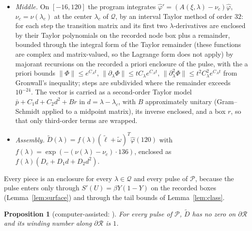 \documentclass[11pt]{article}
\newtheorem{proposition}[lemma]{Proposition}
\theoremstyle{definition}
\newcommand{\Rbox}{\mathcal{R}}
\newcommand{\Pcl}{\mathcal{P}}
\begin{document}
\begin{itemize}
\item \emph{Middle.} On $[-16, 120]$ the program integrates $\hat\varphi' = (A(\xi, \lambda) - \nu_c)\hat\varphi$, $\nu_c = \nu(\lambda_c)$ at the center $\lambda_c$ of $\mathcal{Q}$, by an interval Taylor method of order $32$: for each step the transition matrix and its first two $\lambda$-derivatives are enclosed by their Taylor polynomials on the recorded node box plus a remainder, bounded through the integral form of the Taylor remainder (these functions are complex and matrix-valued, so the Lagrange form does not apply) by majorant recursions on the recorded a priori enclosure of the pulse, with the a priori bounds $\|\Phi\| \le e^{C_At}$, $\|\partial_\lambda\Phi\| \le tC_\lambda e^{C_At}$, $\|\partial_\lambda^2\Phi\| \le t^2C_\lambda^2e^{C_At}$ from Gronwall's inequality; steps are subdivided where the remainder exceeds $10^{-24}$. The vector is carried as a second-order Taylor model $\bar p + C_1d + C_2d^2 + Br$ in $d = \lambda - \lambda_c$, with $B$ approximately unitary (Gram--Schmidt applied to a midpoint matrix), its inverse enclosed, and a box $r$, so that only third-order terms are wrapped.
\item \emph{Assembly.} $\tilde D(\lambda) = f(\lambda)(\tilde\ell + \tilde\omega)^T\hat\varphi(120)$ with $f(\lambda) = \exp(-(\nu(\lambda) - \nu_c)\cdot 136)$, enclosed as $f(\lambda)(D_c + D_1d + D_2d^2)$.
\end{itemize}
Every piece is an enclosure for every $\lambda \in \mathcal{Q}$ and every pulse of $\Pcl$, because the pulse enters only through $S'(U) = \beta Y(1 - Y)$ on the recorded boxes (Lemma~\ref{lem:surface}) and through the tail bounds of Lemma~\ref{lem:class}.

\begin{proposition}[computer-assisted: ]\label{prop:winding}
For every pulse of $\Pcl$, $\tilde D$ has no zero on $\partial\Rbox$ and its winding number along $\partial\Rbox$ is $1$.
\end{proposition}
\end{document}
